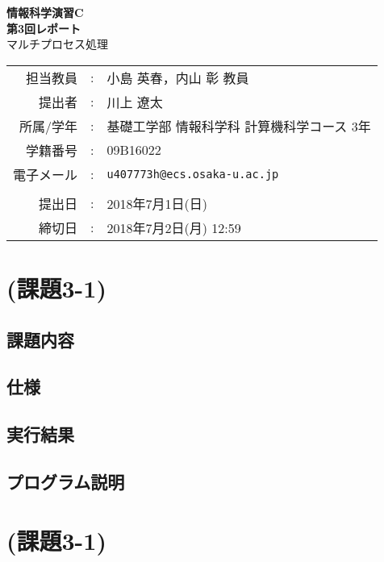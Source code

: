 \documentclass[a4j]{jarticle}
\makeatletter
\newcommand{\lectureName}{情報科学演習C}
\newcommand{\reportNumber}{3}
\newcommand{\reportTitle}{マルチプロセス処理}
\newcommand{\teacherName}{小島 英春，内山 彰 教員}
\newcommand{\deadline}{2018年7月2日(月) 12:59}
\newcommand{\studentName}{川上 遼太}
\newcommand{\studentAff}{基礎工学部 情報科学科 計算機科学コース 3年}
\newcommand{\studentID}{09B16022}
\newcommand{\studentEmail}{u407773h@ecs.osaka-u.ac.jp}
\newcommand{\submitted}{2018年7月1日(日)}
\makeatother
\begin{document}
\begin{titlepage}
\mbox{\vspace{10cm}}

\begin{center}
{\Huge\bfseries
\lectureName \\
第\reportNumber{}回レポート} \\
\vspace{1cm}
{\Large \reportTitle}
\vspace{5cm}

{\large
\begin{tabular}{rcl}
担当教員 & : & \teacherName \\
提出者   & : & \studentName \\
所属/学年   & : & \studentAff\\
学籍番号 & : & \studentID \\
電子メール & : & \texttt{\studentEmail}\\
\\
提出日 & : & \submitted \\
締切日 & : & \deadline
\end{tabular}
}
\end{center}
\end{titlepage}

\tableofcontents
\newpage

\section{(課題3-1) }

\subsection{課題内容}

\subsection{仕様}

\subsection{実行結果}

\subsection{プログラム説明}


\section{(課題3-1) }
\end{document}
